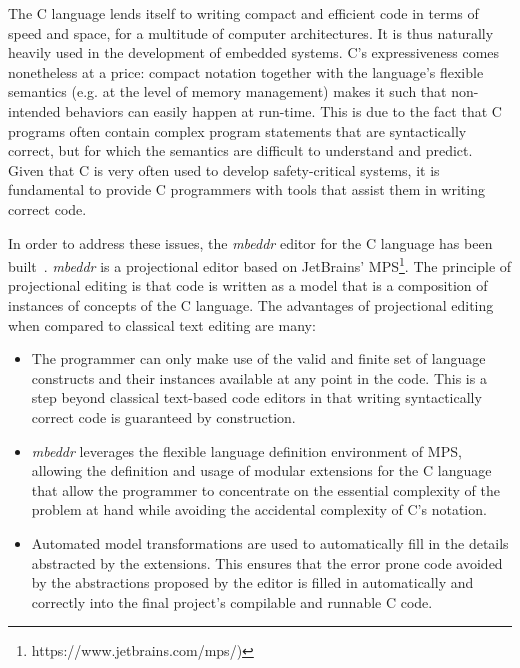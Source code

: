 The C language lends itself to writing compact and efficient code in terms of
speed and space, for a multitude of computer architectures. It is thus naturally
heavily used in the development of embedded systems. C's expressiveness comes
nonetheless at a price: compact notation together with the language's flexible
semantics (e.g. at the level of memory management) makes it such that
non-intended behaviors can easily happen at run-time. This is due to the fact
that C programs often contain complex program statements that are syntactically
correct, but for which the semantics are difficult to understand and predict. Given that C is
very often used to develop safety-critical systems, it is fundamental to provide
C programmers with tools that assist them in writing correct code.

In order to address these issues, the \emph{mbeddr} editor for the C language
has been built~\cite{SzaboVKRS14}. \emph{mbeddr} is a projectional editor based
on JetBrains’ MPS\footnote{https://www.jetbrains.com/mps/)}.
The principle of projectional editing is that code is written as a model that is
a composition of instances of concepts of the C language. The advantages of
projectional editing when compared to classical text editing are many:

\begin{itemize}
  \item The programmer can only make use of the valid and finite set of language
  constructs and their instances available at any point in the code. This is a
  step beyond classical text-based code editors in that writing syntactically
  correct code is guaranteed by construction.
  \item \emph{mbeddr} leverages the flexible language definition environment of MPS,
  allowing the definition and usage of modular extensions for the C language
  that allow the programmer to concentrate on the essential complexity of the problem
  at hand while avoiding the accidental complexity of C’s notation.
  \item Automated model transformations are used to automatically fill in the
  details abstracted by the extensions. This ensures that the error prone code
  avoided by the abstractions proposed by the editor is filled in automatically
  and correctly into the final project’s compilable and runnable C code.
\end{itemize}
